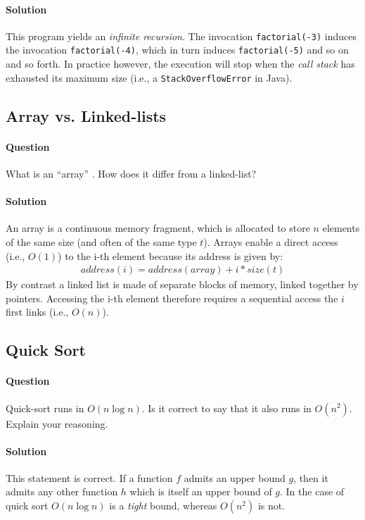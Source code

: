 \documentclass{article}
\begin{document}
\paragraph{Solution} This program yields an \emph{infinite
  recursion}. The invocation \texttt{factorial(-3)} induces
the invocation \texttt{factorial(-4)}, which in turn induces
\texttt{factorial(-5)} and so on and so forth. In practice
however, the execution will stop when the \emph{call stack} has
exhausted its maximum size (i.e., a \texttt{StackOverflowError} in
Java).


\subsection{Array vs. Linked-lists}

\paragraph{Question} What is an ``array'' . How does it differ from a
linked-list?

\paragraph{Solution} An array is a continuous memory fragment, which
is allocated to store $n$ elements of the same size (and often of the
same type $t$). Arrays enable a direct access (i.e., $O(1)$) to the i-th
element because its address is given by:
\begin{align*}
  address(i) = address(array) + i * size(t)
\end{align*}
By contrast a linked list is made of separate blocks of memory, linked
together by pointers. Accessing the i-th element therefore requires
a sequential access the $i$ first links (i.e., $O(n)$).



\subsection{Quick Sort}

\paragraph{Question} Quick-sort runs in $O(n \log n)$. Is it correct
to say that it also runs in $O(n^2)$. Explain your reasoning.

\paragraph{Solution} This statement is correct. If a function $f$
admits an upper bound $g$, then it admits any other function $h$ which
is itself an upper bound of $g$. In the case of quick sort
$O(n \log n)$ is a \emph{tight} bound, whereas $O(n^2)$ is not.
\end{document}
